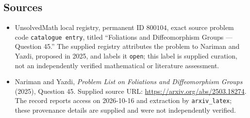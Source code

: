 \documentclass[11pt]{article}
\begin{document}
\subsection{Sources}
\begin{itemize}
\item UnsolvedMath local registry, permanent ID \(800104\), exact source problem code \texttt{catalogue entry}, titled ``Foliations and Diffeomorphism Groups --- Question 45.'' The supplied registry attributes the problem to Nariman and Yazdi, proposed in 2025, and labels it \texttt{open}; this label is supplied curation, not an independently verified mathematical or literature assessment.
\item Nariman and Yazdi, \emph{Problem List on Foliations and Diffeomorphism Groups} (2025), Question 45. Supplied source URL: \url{https://arxiv.org/abs/2503.18274}. The record reports access on 2026-10-16 and extraction by \texttt{arxiv\_latex}; these provenance details are supplied and were not independently verified.
\end{itemize}
\end{document}
